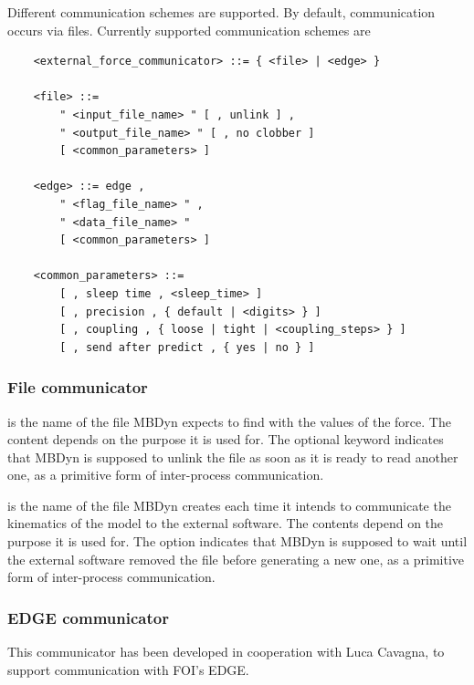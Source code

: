 Different communication schemes are supported.
By default, communication occurs via files.
Currently supported communication schemes are
\begin{verbatim}
    <external_force_communicator> ::= { <file> | <edge> }

    <file> ::=
        " <input_file_name> " [ , unlink ] ,
        " <output_file_name> " [ , no clobber ]
        [ <common_parameters> ]

    <edge> ::= edge ,
        " <flag_file_name> " ,
        " <data_file_name> "
        [ <common_parameters> ]

    <common_parameters> ::=
        [ , sleep time , <sleep_time> ]
        [ , precision , { default | <digits> } ]
        [ , coupling , { loose | tight | <coupling_steps> } ]
        [ , send after predict , { yes | no } ]
\end{verbatim}

\subsubsection{File communicator}
 is the name of the file MBDyn expects to find
with the values of the force.
The content depends on the purpose it is used for.
The optional keyword  indicates that MBDyn is supposed
to unlink the file as soon as it is ready to read another one,
as a primitive form of inter-process communication.

 is the name of the file MBDyn creates
each time it intends to communicate the kinematics of the model
to the external software.
The contents depend on the purpose it is used for.
The option  indicates that MBDyn is supposed to wait
until the external software removed the file before generating a new one,
as a primitive form of inter-process communication.



\subsubsection{EDGE communicator}
This communicator has been developed in cooperation with Luca Cavagna,
to support communication with FOI's EDGE.


